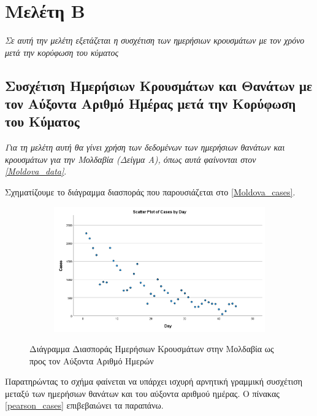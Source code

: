 \documentclass{article}
\begin{document}
\newpage
    
\section{Μελέτη Β}
\emph{Σε αυτή την μελέτη εξετάζεται η συσχέτιση των ημερήσιων κρουσμάτων με τον χρόνο μετά την κορύφωση του κύματος} 

    \subsection{Συσχέτιση Ημερήσιων Κρουσμάτων και Θανάτων με τον Αύξοντα Αριθμό Ημέρας μετά την Κορύφωση του Κύματος}
    \emph{Για τη μελέτη αυτή θα γίνει χρήση των δεδομένων των ημερήσιων θανάτων και κρουσμάτων για την Μολδαβία (Δείγμα Α), όπως αυτά φαίνονται στον \autoref{Moldova_data}}.
    
    Σχηματίζουμε το διάγραμμα διασποράς που παρουσιάζεται στο \autoref{Moldova_cases}.
    \begin{figure}[H]
        \centering
        \begin{adjustbox}{center}
        	\begin{subfigure}[c]{1\textwidth}    
        		\includegraphics[width=1\textwidth,height=\textheight,keepaspectratio]{media/2/scatterplot_cases.png}
        	\end{subfigure}%
        \end{adjustbox}
        \caption{Διάγραμμα Διασποράς Ημερήσιων Κρουσμάτων στην Μολδαβία ως προς τον Αύξοντα Αριθμό Ημερών}
    \label{Moldova_cases}
    \end{figure}
    
    Παρατηρώντας το σχήμα φαίνεται να υπάρχει ισχυρή αρνητική γραμμική συσχέτιση μεταξύ των ημερήσιων θανάτων και του αύξοντα αριθμού ημέρας. Ο πίνακας \autoref{pearson_cases} επιβεβαιώνει τα παραπάνω.
    
\end{document}
